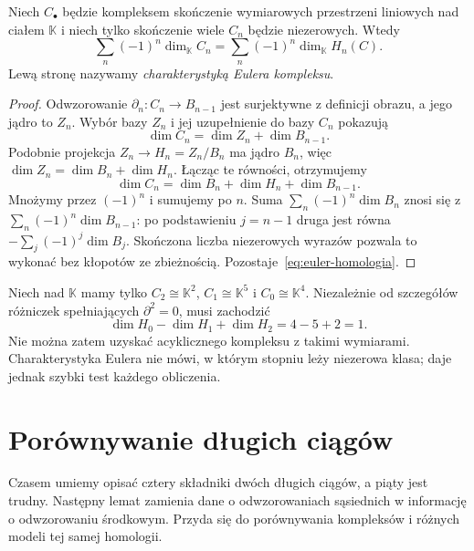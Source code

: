 \begin{twierdzenie}
\label{thm:euler-homologia}
Niech $C_\bullet$ będzie kompleksem
skończenie wymiarowych przestrzeni
liniowych nad ciałem $\mathbb K$
i niech tylko skończenie wiele $C_n$
będzie niezerowych. Wtedy
\begin{equation}\label{eq:euler-homologia}
 \sum_n(-1)^n\dim_{\mathbb K}C_n
 =\sum_n(-1)^n\dim_{\mathbb K}H_n(C).
\end{equation}
Lewą stronę nazywamy \emph{charakterystyką
Eulera kompleksu}.
\end{twierdzenie}
\begin{proof}
Odwzorowanie $\partial_n:C_n\to B_{n-1}$ jest
surjektywne z definicji obrazu,
a jego jądro to $Z_n$.
Wybór bazy $Z_n$ i jej uzupełnienie
do bazy $C_n$ pokazują
\[
 \dim C_n=\dim Z_n+\dim B_{n-1}.
\]
Podobnie projekcja $Z_n\to H_n=Z_n/B_n$
ma jądro $B_n$, więc
$\dim Z_n=\dim B_n+\dim H_n$.
Łącząc te równości, otrzymujemy
\[
 \dim C_n=\dim B_n+\dim H_n+\dim B_{n-1}.
\]
Mnożymy przez $(-1)^n$ i sumujemy
po $n$. Suma
$\sum_n(-1)^n\dim B_n$
znosi się z
$\sum_n(-1)^n\dim B_{n-1}$:
po podstawieniu $j=n-1$
druga jest równa
$-\sum_j(-1)^j\dim B_j$.
Skończona liczba niezerowych
wyrazów pozwala to wykonać bez
kłopotów ze zbieżnością.
Pozostaje~\eqref{eq:euler-homologia}.
\end{proof}

\begin{przyklad}
Niech nad $\mathbb K$ mamy tylko
$C_2\cong\mathbb K^2$, $C_1\cong\mathbb K^5$
i $C_0\cong\mathbb K^4$.
Niezależnie od szczegółów różniczek
spełniających $\partial^2=0$, musi zachodzić
\[
 \dim H_0-\dim H_1+\dim H_2
 =4-5+2=1.
\]
Nie można zatem uzyskać
acyklicznego kompleksu z takimi
wymiarami. Charakterystyka Eulera
nie mówi, w którym stopniu leży
niezerowa klasa; daje jednak
szybki test każdego obliczenia.
\end{przyklad}

\section{Porównywanie długich ciągów}
\label{sec:lemat-pieciu}

Czasem umiemy opisać cztery składniki
dwóch długich ciągów, a piąty jest trudny.
Następny lemat zamienia dane o odwzorowaniach
sąsiednich w informację o odwzorowaniu środkowym.
Przyda się do porównywania kompleksów
i różnych modeli tej samej homologii.

